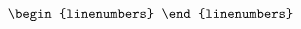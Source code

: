 \documentclass[10pt]{article}
\begin{document}
\[\begin{linenumbers}
%
%
%
%

\end{linenumbers}\]
\end{document}
